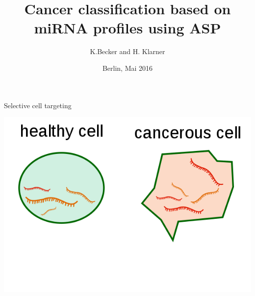 \documentclass[10pt]{beamer}
\begin{document}
\title{Cancer classification based on miRNA profiles using ASP} 
\author{K.Becker and H. Klarner}
\date{Berlin, Mai 2016}



\frame{\titlepage}





\begin{frame}{Selective cell targeting}
\begin{center}
\includegraphics[scale=0.4]{cells.png}
\end{center}
\end{frame}
\end{document}
